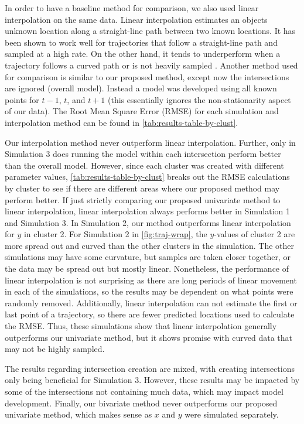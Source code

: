 \documentclass[12pt]{article}
\begin{document}
In order to have a baseline method for comparison, we also used linear
interpolation on the same data. Linear interpolation estimates an
objects unknown location along a straight-line path between two known
locations. It has been shown to work well for trajectories that follow a
straight-line path and sampled at a high rate. On the other hand, it
tends to underperform when a trajectory follows a curved path or is not
heavily sampled \citep{wentz_comparison_2003, guo_improved_2021}.
Another method used for comparison is similar to our proposed method,
except now the intersections are ignored (overall model). Instead a
model was developed using all known points for \(t-1\), \(t\), and
\(t+1\) (this essentially ignores the non-stationarity aspect of our
data). The Root Mean Square Error (RMSE) for each simulation and
interpolation method can be found in \cref{tab:results-table-by-clust}.

Our interpolation method never outperform linear interpolation. Further,
only in Simulation 3 does running the model within each intersection
perform better than the overall model. However, since each cluster was
created with different parameter values,
\cref{tab:results-table-by-clust} breaks out the RMSE calculations by
cluster to see if there are different areas where our proposed method
may perform better. If just strictly comparing our proposed univariate
method to linear interpolation, linear interpolation always performs
better in Simulation 1 and Simulation 3. In Simulation 2, our method
outperforms linear interpolation for \(y\) in cluster 2. For Simulation
2 in \cref{fig:traj-wrap}, the \(y\)-values of cluster 2 are more spread
out and curved than the other clusters in the simulation. The other
simulations may have some curvature, but samples are taken closer
together, or the data may be spread out but mostly linear. Nonetheless,
the performance of linear interpolation is not surprising as there are
long periods of linear movement in each of the simulations, so the
results may be dependent on what points were randomly removed.
Additionally, linear interpolation can not estimate the first or last
point of a trajectory, so there are fewer predicted locations used to
calculate the RMSE. Thus, these simulations show that linear
interpolation generally outperforms our univariate method, but it shows
promise with curved data that may not be highly sampled.

The results regarding intersection creation are mixed, with creating
intersections only being beneficial for Simulation 3. However, these
results may be impacted by some of the intersections not containing much
data, which may impact model development. Finally, our bivariate method
never outperforms our proposed univariate method, which makes sense as
\(x\) and \(y\) were simulated separately.
\end{document}
